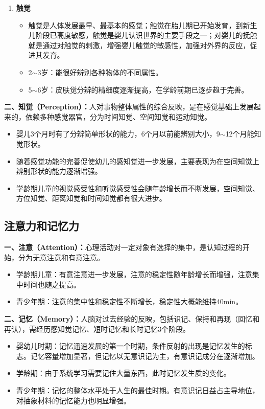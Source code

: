 \begin{keybox}
\begin{enumerate}[leftmargin=*]
    \item \textbf{触觉}
    \begin{itemize}[leftmargin=*]
        \item 触觉是人体发展最早、最基本的感觉；触觉在胎儿期已开始发育，到新生儿阶段已高度敏感，触觉是婴儿认识世界的主要手段之一；对婴儿的抚触就是通过对触觉的刺激，增强婴儿触觉的敏感性，加强对外界的反应，促进其发育。
        \item 2$\sim$3岁：能很好辨别各种物体的不同属性。
        \item 5$\sim$6岁：皮肤觉分辨的精细度逐渐提高，在学龄前期已逐步趋于完善。
    \end{itemize}
\end{enumerate}

\textbf{二、知觉（Perception）：}人对事物整体属性的综合反映，是在感觉基础上发展起来的，依赖多种感觉器官，分为时间知觉、空间知觉和运动知觉。

\begin{itemize}[leftmargin=*]
    \item 婴儿3个月时有了分辨简单形状的能力，6个月以前能辨别大小，9$\sim$12个月能知觉形状。
    \item 随着感觉功能的完善促使幼儿的感知觉进一步发展，主要表现为在空间知觉上辨别形状的能力逐渐增强。
    \item 学龄期儿童的视觉感受性和听觉感受性会随年龄增长而不断发展，空间知觉、方位知觉、距离知觉和时间知觉都有很大进步。
\end{itemize}
\end{keybox}

\subsection{注意力和记忆力}

\begin{keybox}
\textbf{一、注意（Attention）：}心理活动对一定对象有选择的集中，是认知过程的开始，分为无意注意和有意注意。

\begin{itemize}[leftmargin=*]
    \item 学龄期儿童：有意注意进一步发展，注意的稳定性随年龄增长而增强，注意集中时间也随之提高。
    \item 青少年期：注意的集中性和稳定性不断增长，稳定性大概能维持40min。
\end{itemize}

\textbf{二、记忆（Memory）：}人脑对过去经验的反映，包括识记、保持和再现（回忆和再认），需经历感知觉记忆、短时记忆和长时记忆3个阶段。

\begin{itemize}[leftmargin=*]
    \item 婴幼儿时期：记忆迅速发展的第一个时期，条件反射的出现是记忆发生的标志。记忆容量增加显著，但记忆以无意识记为主，有意识记成分在逐渐增加。
    \item 学龄期：由于系统学习需要记住大量东西，此时记忆发生质的变化。
    \item 青少年期：记忆的整体水平处于人生的最佳时期。有意识记日益占主导地位，对抽象材料的记忆能力也明显增强。
\end{itemize}
\end{keybox}

